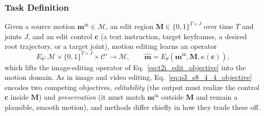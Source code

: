 \subsubsection{Task Definition}
\label{subsubsec:p3_s8_4_4_task}
Given a source motion $\mathbf{m}^{\text{in}}\!\in\!\mathcal{M}$, an edit region $\mathbf{M}\!\in\!\{0,1\}^{T\times J}$ over time $T$ and joints $J$, and an edit control $\mathbf{c}$ (a text instruction, target keyframes, a desired root trajectory, or a target joint), motion editing learns an operator
\begin{equation}
\label{eq:p3_s8_4_4_objective}
E_\theta:\mathcal{M}\!\times\!\{0,1\}^{T\times J}\!\times\!\mathcal{C}'\!\to\!\mathcal{M},\qquad
\hat{\mathbf{m}}=E_\theta\!\left(\mathbf{m}^{\text{in}},\mathbf{M},\kappa(\mathbf{c})\right),
\end{equation}
which lifts the image-editing operator of Eq.~\eqref{eq:t2i_edit_objective} into the motion domain. As in image and video editing, Eq.~\eqref{eq:p3_s8_4_4_objective} encodes two competing objectives, \emph{editability} (the output must realize the control $\mathbf{c}$ inside $\mathbf{M}$) and \emph{preservation} (it must match $\mathbf{m}^{\text{in}}$ outside $\mathbf{M}$ and remain a plausible, smooth motion), and methods differ chiefly in how they trade these off.



